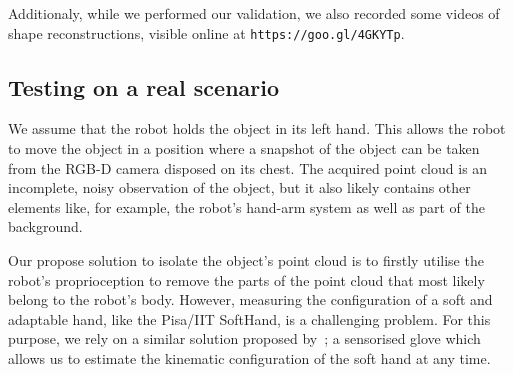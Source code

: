 Additionaly, while we performed our validation, we also recorded some videos of shape reconstructions, visible online at \texttt{https://goo.gl/4GKYTp}.
\subsection{Testing on a real scenario}
\label{sec:real}


We assume that the robot holds the object in its left hand. This allows the robot to move the object in a position where a snapshot of the object can be taken from the RGB-D camera disposed on its chest. 
The acquired point cloud is an incomplete, noisy observation of the object, but it also likely contains other elements like, for example, the robot's hand-arm system as well as part of the background. 

Our propose solution to isolate the object's point cloud is to firstly utilise the robot's proprioception to remove the parts of the point cloud that most likely belong to the robot's body. However, measuring  the  configuration of  a  soft and  adaptable hand, like the Pisa/IIT SoftHand, is a challenging problem. For this purpose, we rely on a similar solution proposed by~\citet{Santaera2015Lowcost}; a sensorised glove which allows us to estimate the kinematic configuration of the soft hand at any time.

